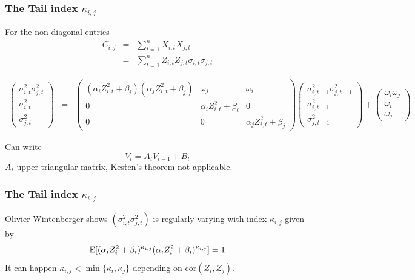 \documentclass{beamer}
\begin{document}
  \begin{frame}
  \frametitle{The Tail index $\kappa_{i,j}$}
    For the non-diagonal entries
    \begin{eqnarray*}
      C_{i, j} &=& \sum_{t=1}^n X_{i, t} X_{j, t} \\
      &=& \sum_{t=1}^n Z_{i, t} Z_{j, t} \sigma_{i, t} \sigma_{j, t}
    \end{eqnarray*}

    \begin{tiny}
      \begin{eqnarray*}
        \begin{pmatrix}
          \sigma_{i,t}^2 \sigma_{j,t}^2 \\
          \sigma_{i,t}^2 \\
          \sigma_{j,t}^2
        \end{pmatrix}
        &=&
        \begin{pmatrix}
          (\alpha_i Z_{i,t}^2 + \beta_i) (\alpha_j Z_{i,t}^2 + \beta_j) & \omega_j & \omega_i \\
          0 & \alpha_i Z_{i,t}^2 + \beta_i & 0 \\
          0 & 0 & \alpha_j Z_{i,t}^2 + \beta_j
        \end{pmatrix}
        \begin{pmatrix}
          \sigma_{i,t-1}^2 \sigma_{j,t-1}^2 \\
          \sigma_{i,t-1}^2 \\
          \sigma_{j,t-1}^2
        \end{pmatrix} +
        \begin{pmatrix}
          \omega_i \omega_j\\
          \omega_i \\
          \omega_j
        \end{pmatrix}
      \end{eqnarray*}
    \end{tiny}
    Can write
    \[
    V_t = A_t V_{t-1} + B_t
    \]
    $A_t$ upper-triangular matrix, Kesten's theorem not applicable.
  \end{frame}

  \begin{frame}
    \frametitle{The Tail index $\kappa_{i,j}$}
    Olivier Wintenberger shows $(\sigma_{i,t}^2 \sigma_{j,t}^2)$ is regularly
    varying with index $\kappa_{i,j}$ given by
    \[
    \mathbb{E} [(\alpha_i Z_i^2 + \beta_i)^{\kappa_{i,j}}(\alpha_i Z_i^2 +
    \beta_i)^{\kappa_{i,j}}] = 1
    \]
    It can happen $\kappa_{i,j} < \min\{\kappa_i, \kappa_j\}$
    depending on $\text{cor}(Z_i, Z_j)$.
  \end{frame}
\end{document}
